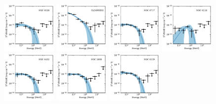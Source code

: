 \documentclass[doublespace,nopageskip]{VTthesis} %
\begin{document}
\begin{appendices}
\begin{figure}
\includegraphics[width=0.24\textwidth]{Figures/Globular/spectra/PLE_spectrum_20.pdf}
\includegraphics[width=0.24\textwidth]{Figures/Globular/spectra/PLE_spectrum_2.pdf}
\includegraphics[width=0.24\textwidth]{Figures/Globular/spectra/PLE_spectrum_23.pdf}
\includegraphics[width=0.24\textwidth]{Figures/Globular/spectra/PLE_spectrum_10.pdf}
\includegraphics[width=0.24\textwidth]{Figures/Globular/spectra/PLE_spectrum_17.pdf}
\includegraphics[width=0.24\textwidth]{Figures/Globular/spectra/PLE_spectrum_5.pdf}
\includegraphics[width=0.24\textwidth]{Figures/Globular/spectra/PLE_spectrum_9.pdf}

\end{figure}
\end{appendices}
\end{document}
